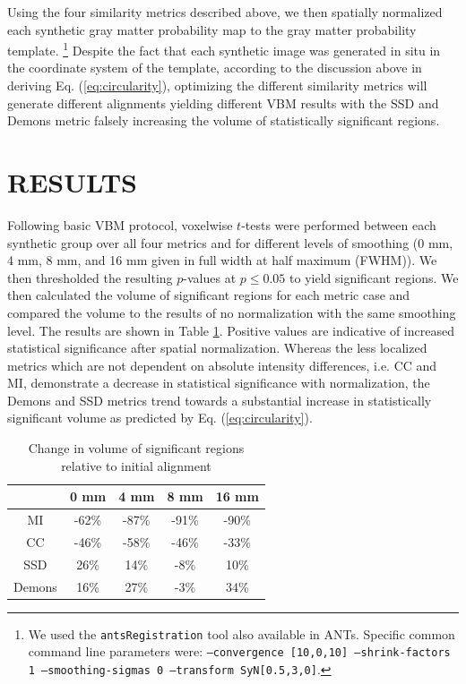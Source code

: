 \documentclass[]{spie}  %
\begin{document}
Using the four similarity metrics described above, we then spatially normalized
each synthetic gray matter probability map to the gray matter probability
template.%
\footnote{
We used the \texttt{antsRegistration} tool also available in ANTs.  Specific common command line
parameters were: \texttt{--convergence [10,0,10] --shrink-factors 1 --smoothing-sigmas 0
--transform SyN[0.5,3,0]}.
}
Despite the fact that each synthetic image was generated in situ 
in the coordinate system of the template, according to the discussion above
in deriving Eq. (\ref{eq:circularity}), optimizing the different similarity metrics will
generate different alignments yielding different VBM results with the SSD and Demons
metric falsely increasing the volume of statistically significant regions.


\section{RESULTS} 

Following basic VBM protocol, voxelwise $t$-tests were performed between each
synthetic group over all four metrics and for different levels of smoothing
(0 mm, 4 mm, 8 mm, and 16 mm given in full width at half maximum (FWHM)).  
We then thresholded the resulting $p$-values at $p \leq 0.05$ to yield 
significant regions.  We then calculated the volume of significant regions
for each metric case and compared the volume to the results of
no normalization with the same smoothing level.  The results are shown in 
Table \ref{table:results}.  Positive values are indicative of 
increased statistical significance after spatial normalization.
Whereas the less localized metrics which are not dependent on absolute
intensity differences, i.e. CC and MI, demonstrate a decrease in statistical
significance with normalization, the Demons and SSD metrics 
trend towards a substantial increase in statistically significant volume
as predicted by Eq. (\ref{eq:circularity}).

\begin{table}
\begin{center}
\caption{Change in volume of significant regions relative to 
initial alignment}
\label{table:results}
\begin{tabular*}{0.75\textwidth}{@{\extracolsep{\fill}}ccccc}
{} & 0 mm & 4 mm & 8 mm & 16 mm\\
\hline
MI     & -62\% & -87\% & -91\% & -90\% \\
CC     & -46\% & -58\% & -46\% & -33\% \\
SSD    &  26\% &  14\% & -8\%  &  10\% \\
Demons &  16\% &  27\% & -3\%  &  34\% \\
\hline
\end{tabular*}
\end{center}
\end{table}
\end{document}
